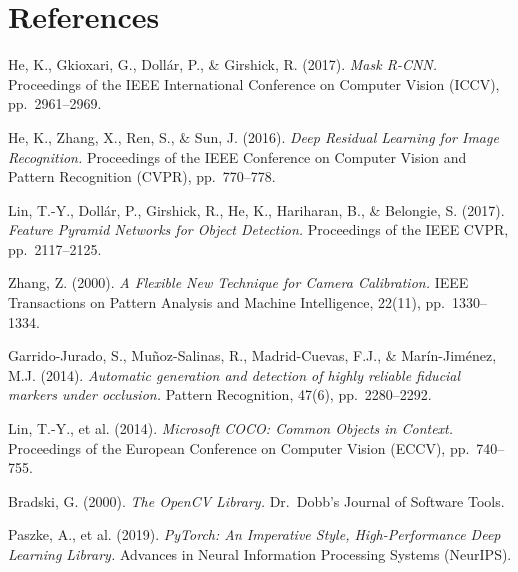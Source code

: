 \documentclass[12pt, a4paper, twoside]{report}
\begin{document}
\chapter*{References}

\begin{enumerate}[label={[\arabic*]}]
    \item He, K., Gkioxari, G., Doll{\'a}r, P., \& Girshick, R. (2017). \textit{Mask R-CNN.} Proceedings of the IEEE International Conference on Computer Vision (ICCV), pp.\ 2961--2969.
    \item He, K., Zhang, X., Ren, S., \& Sun, J. (2016). \textit{Deep Residual Learning for Image Recognition.} Proceedings of the IEEE Conference on Computer Vision and Pattern Recognition (CVPR), pp.\ 770--778.
    \item Lin, T.-Y., Doll{\'a}r, P., Girshick, R., He, K., Hariharan, B., \& Belongie, S. (2017). \textit{Feature Pyramid Networks for Object Detection.} Proceedings of the IEEE CVPR, pp.\ 2117--2125.
    \item Zhang, Z. (2000). \textit{A Flexible New Technique for Camera Calibration.} IEEE Transactions on Pattern Analysis and Machine Intelligence, 22(11), pp.\ 1330--1334.
    \item Garrido-Jurado, S., Mu{\~n}oz-Salinas, R., Madrid-Cuevas, F.J., \& Mar{\'i}n-Jim{\'e}nez, M.J. (2014). \textit{Automatic generation and detection of highly reliable fiducial markers under occlusion.} Pattern Recognition, 47(6), pp.\ 2280--2292.
    \item Lin, T.-Y., et al. (2014). \textit{Microsoft COCO: Common Objects in Context.} Proceedings of the European Conference on Computer Vision (ECCV), pp.\ 740--755.
    \item Bradski, G. (2000). \textit{The OpenCV Library.} Dr.\ Dobb's Journal of Software Tools.
    \item Paszke, A., et al. (2019). \textit{PyTorch: An Imperative Style, High-Performance Deep Learning Library.} Advances in Neural Information Processing Systems (NeurIPS).
\end{enumerate}
\end{document}
